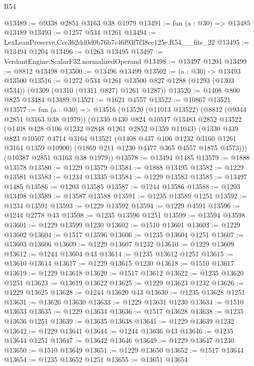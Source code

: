 \begin{lexlean}{R54}
\begin{coremodule}
@13489 := @9338 @2851 @3163 @38 @1979
@13491 := fun (a : @30) => @13485 @13489
@13493 := @1257 @534 @1261
@13494 := LexLeanPreserve.Ccc362dd0d0b76b7c46f93f7f38ec125e.R54.__fits_22
@13495 := @13494 @1204
@13496 := @1263 @13495
@13497 := VerdantEngine.ScalarF32.normalizedOperand
@13498 := @13497 @1204
@13499 := @8812 @13498
@13500 := @13496 @13499
@13502 := (a : @30) -> @13493 @13500
@13516 := @1272
    @534
    @1261
    @13500
    @827
    @1288
    (@1293 (@1303 @534))
    (@1309 (@1310 (@1311 @827) @1261 @1287))
@13520 := @1408 @800 @825 @13484 @13489
@13521 := @1621 @4557
@13522 := @10867 @13521
@13577 := fun (a : @30) =>
  @13516
    (@13520
      (@11013 @13522)
      (@8812 (@9344 @2851 @3163 @38 @1979))
      (@1330
        @430
        @824
        @10517
        @13483
        @2852
        @13522
        (@1408 @428 @106 @1232 @2848 @1261 @2852 @1359 @11043)
        (@1330
          @439
          @823
          @10507
          @4714
          @3164
          @13521
          (@1408 @437 @106 @1232 @3160 @1261 @3164 @1359 @10900)
          (@1869 @211 @1230 @4477 @365 @4557 @1875 @4573)))
      (@10387 @2851 @3163 @38 @1979))
@13578 := @13494 @1485
@13579 := @1888 @13578
@13580 := @1229 @13579
@13581 := @1888 @13495
@13582 := @1229 @13581
@13583 := @1234 @13335
@13584 := @1229 @13583
@13585 := @13497 @1485
@13586 := @1203 @13585
@13587 := @1244 @13586
@13588 := @1203 @13498
@13589 := @13587 @13588
@13591 := @1235 @13589 @1251
@13592 := @1234 @13591
@13593 := @1229 @13592
@13594 := @1229 @4591
@13596 := @1244 @2778 @43
@13598 := @1235 @13596 @1251
@13599 := @13594 @13598
@13601 := @1229 @13599 @1230
@13602 := @1510 @13601
@13603 := @1229 @13602
@13604 := @1517 @13596
@13606 := @1235 @13604 @1251
@13607 := @13603 @13606
@13609 := @1229 @13607 @1232
@13610 := @1229 @13609
@13612 := @1244 @13604 @43
@13614 := @1235 @13612 @1251
@13615 := @13610 @13614
@13617 := @1229 @13615 @1230
@13618 := @1510 @13617
@13619 := @1229 @13618
@13620 := @1517 @13612
@13622 := @1235 @13620 @1251
@13623 := @13619 @13622
@13625 := @1229 @13623 @1232
@13626 := @1229 @13625
@13628 := @1244 @13620 @43
@13630 := @1235 @13628 @1251
@13631 := @13626 @13630
@13633 := @1229 @13631 @1230
@13634 := @1510 @13633
@13635 := @1229 @13634
@13636 := @1517 @13628
@13638 := @1235 @13636 @1251
@13639 := @13635 @13638
@13641 := @1229 @13639 @1232
@13642 := @1229 @13641
@13644 := @1244 @13636 @43
@13646 := @1235 @13644 @1251
@13647 := @13642 @13646
@13649 := @1229 @13647 @1230
@13650 := @1510 @13649
@13651 := @1229 @13650
@13652 := @1517 @13644
@13654 := @1235 @13652 @1251
@13655 := @13651 @13654

\end{coremodule}
\end{lexlean}
